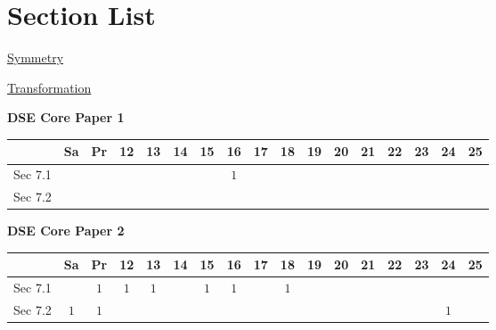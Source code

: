 \documentclass[12pt, a4paper]{article}
\begin{document}
\section*{Section List}
\begin{enumx}[label=Sec 7.\arabic*\ ]
\item \hyperref[section:1-7-1]{Symmetry}
\item \hyperref[section:1-7-2]{Transformation}
\end{enumx}
\begin{absolutelynopagebreak}
\begin{center}
\textbf{DSE Core Paper 1}
\end{center}
\begin{center}
\begin{tabular}{|l|c|c|c|c|c|c|c|c|c|c|c|c|c|c|c|c|}
\hline
        & Sa & Pr & 12 & 13 & 14 & 15 & 16 & 17 & 18 & 19 & 20 & 21 & 22 & 23 & 24 & 25 \\\hline\hline
Sec 7.1 &  &  &  &  &  &  &  $1$ &  &  &  &  &  &  &  &  &  \\\hline
Sec 7.2 &  &  &  &  &  &  &  &  &  &  &  &  &  &  &  &  \\\hline
\end{tabular}
\end{center}
\end{absolutelynopagebreak}
\begin{absolutelynopagebreak}
\begin{center}
\textbf{DSE Core Paper 2}
\end{center}
\begin{center}
\begin{tabular}{|l|c|c|c|c|c|c|c|c|c|c|c|c|c|c|c|c|}
\hline
        & Sa & Pr & 12 & 13 & 14 & 15 & 16 & 17 & 18 & 19 & 20 & 21 & 22 & 23 & 24 & 25 \\\hline\hline
Sec 7.1 &  &  $1$ &  $1$ &  $1$ &  &  $1$ &  $1$ &  &  $1$ &  &  &  &  &  &  &  \\\hline
Sec 7.2 &  $1$ &  $1$ &  &  &  &  &  &  &  &  &  &  &  &  &  $1$ &  \\\hline
\end{tabular}
\end{center}
\end{absolutelynopagebreak}
\end{document}
